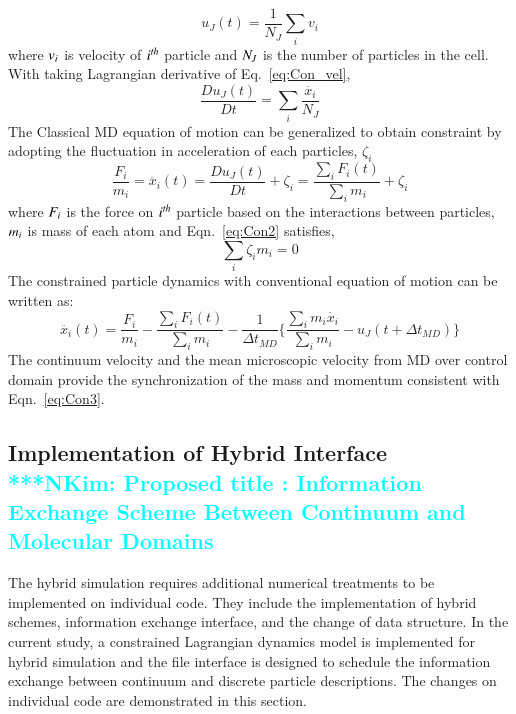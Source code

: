 \documentclass[preprint,12pt]{elsarticle}
\newcommand{\Nkimnote}[1]{ {\textcolor{cyan} { ***NKim: #1 }}}
\newcommand{\Nkimnote}[1]{}
\begin{document}
{\vspace{-.2em}
\begin{equation}
 u_{J}(t) = \frac{1}{N_{J}} \displaystyle\sum_{i} v_{i}
 \label{eq:Con_vel}
\end{equation}
\normalsize
where $\it v_{i}$ is velocity of $\it i^{th}$ particle and $\it N_{J}$ is the number of particles in the cell. With taking Lagrangian derivative of Eq.~\ref{eq:Con_vel},
\vspace{-.2em}
\begin{equation}
 \frac{Du_{J}(t)}{Dt} =  \displaystyle\sum_{i} \frac{\ddot{x_{i}}}{N_{J}}
 \label{eq:Lagrangian}
\end{equation}
\normalsize
The Classical MD equation of motion can be generalized to obtain constraint by adopting the fluctuation in acceleration of each particles, $\zeta_{i}$
\vspace{-.2em}
\begin{equation}
 \frac{F_{i}}{m_{i}} = \ddot{x_{i}}(t)  =   \frac{Du_{J}(t)}{Dt} + \zeta_{i} = \frac{\displaystyle\sum_{i}F_{i}(t)} {\displaystyle\sum_{i}m_{i}} +   \zeta_{i}
 \label{eq:Con2}
\end{equation}
\normalsize
where $\it F_{i}$ is the force on $\it i^{th}$ particle based on the interactions between particles,  $\it m_{i}$ is mass of each atom and  Eqn.~\ref{eq:Con2} satisfies,
\vspace{-.2em}
\begin{equation}
\displaystyle\sum_{i}\zeta_{i}m_{i} = 0
 \label{eq:Con2}
\end{equation}
\normalsize
The constrained particle dynamics with conventional equation of motion can be written as:
\vspace{-.2em}
\begin{equation}
 \ddot{x_{i}}(t) = \frac{F_{i}}{m_{i}} -  \frac{\displaystyle\sum_{i}F_{i}(t)} {\displaystyle\sum_{i}m_{i}} - \frac{1}{\Delta t_{MD}} \{  \frac{\displaystyle\sum_{i}m_{i}\dot{x_{i}}} {\displaystyle\sum_{i}m_{i}} - u_{J}(t + \Delta t_{MD})\}
 \label{eq:Con3}
\end{equation}
\normalsize
The continuum velocity and the mean microscopic velocity from MD over control domain provide the synchronization of the mass and momentum consistent with Eqn.~\ref{eq:Con3}.
}




\subsection{Implementation of Hybrid Interface
\\
\Nkimnote{Proposed title : Information Exchange Scheme Between Continuum and Molecular Domains}}
The hybrid simulation requires additional numerical treatments to be implemented on individual code. They include the implementation of hybrid schemes, information exchange interface, and the change of data structure. In the current study, a constrained Lagrangian dynamics model is implemented for hybrid simulation and the file interface is designed to schedule the information exchange between continuum and discrete particle descriptions. The changes on individual code are demonstrated in this section.
\end{document}
